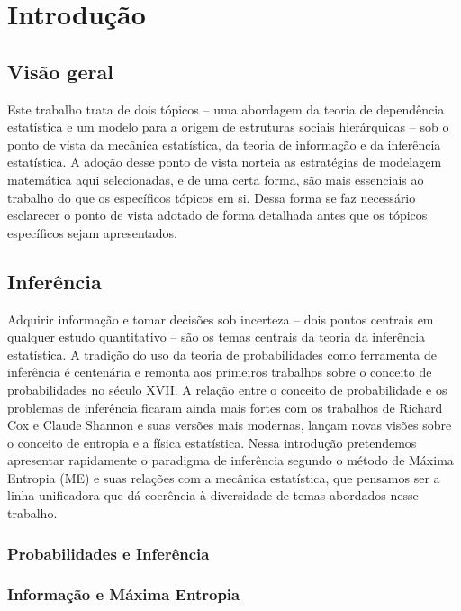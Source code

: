 \chapter{Introdução}

\section{Visão geral}
Este trabalho trata de dois tópicos -- uma abordagem da teoria de dependência estatística e um modelo para a origem de estruturas sociais hierárquicas -- sob o ponto de vista da mecânica estatística, da teoria de informação e da inferência estatística. A adoção desse ponto de vista norteia as estratégias de modelagem matemática aqui selecionadas, e de uma certa forma, são mais essenciais ao trabalho do que os específicos tópicos em si. Dessa forma se faz necessário esclarecer o ponto de vista adotado de forma detalhada antes que os tópicos específicos sejam apresentados.

\section{Inferência}

Adquirir informação e tomar decisões sob incerteza -- dois pontos centrais em qualquer estudo quantitativo -- são os temas centrais da teoria da inferência estatística. A tradição do uso da teoria de probabilidades como ferramenta de inferência é centenária e remonta aos primeiros trabalhos sobre o conceito de probabilidades no século XVII\sourcesneeded. A relação entre o conceito de probabilidade e os problemas de inferência ficaram ainda mais fortes com os trabalhos de Richard Cox\cite{Cox1946,Cox1961} e Claude Shannon\cite{Shannon1948} e suas versões mais modernas\cite{ACaticha2008, ACaticha2009}, lançam novas visões sobre o conceito de entropia e a física estatística. Nessa introdução pretendemos apresentar rapidamente o paradigma de inferência segundo o método de Máxima Entropia (ME) e suas relações com a mecânica estatística, que pensamos ser a linha unificadora que dá coerência à diversidade de temas abordados nesse trabalho. 

\subsection{Probabilidades e Inferência}
\subsection{Informação e Máxima Entropia}

